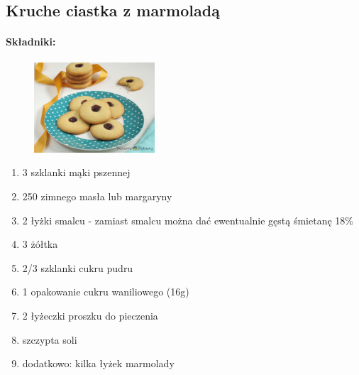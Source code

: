 \documentclass{article}
\begin{document}
    \subsection{Kruche ciastka z marmoladą}
    \bigskip

    \paragraph{Składniki:}
    \begin{figure}
        \includegraphics[width=0.4\textwidth]{kruche_ciasteczka_marmolada.jpg}
    \end{figure}
    \begin{enumerate}
        \item 3 szklanki mąki pszennej
        \item 250 zimnego masła lub margaryny
        \item 2 łyżki smalcu - zamiast smalcu można dać ewentualnie gęstą
            śmietanę 18\%
        \item 3 żółtka
        \item 2/3 szklanki cukru pudru
        \item 1 opakowanie cukru waniliowego (16g)
        \item 2 łyżeczki proszku do pieczenia
        \item szczypta soli
        \item dodatkowo: kilka łyżek marmolady
    \end{enumerate}
\end{document}
